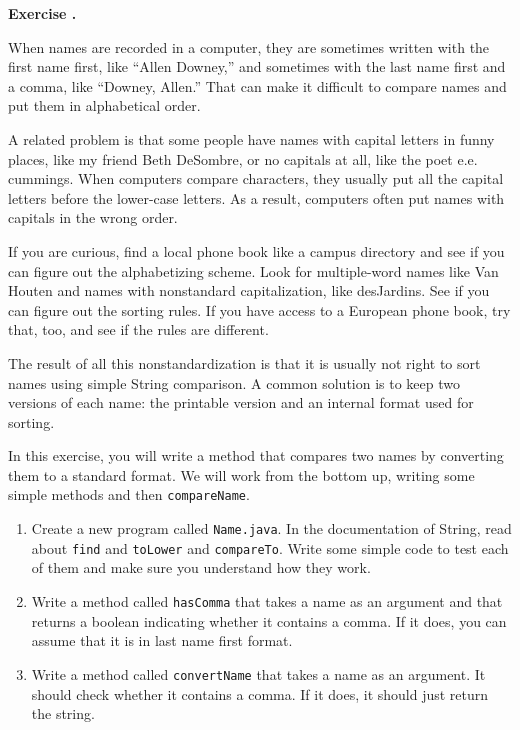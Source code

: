 \documentclass{book}
\newcounter{exercisenum}
\renewcommand{\theexercisenum}{{\thechapter}.\arabic{exercisenum}}
\newenvironment{exercisesize}{\begin{small}}{\end{small}}
\newcommand{\exerciseheader}[2]{                                          
     
  \begin{exercisesize}                                                    
     
     
  \def\theenumi{\alph{enumi}}                                             
  \def\labelenumi{\theenumi.}                                             
  \def\theenumii{\roman{enumii}}                                          
  \def\labelenumii{\theenumii.}                                           
  {\bf Exercise {#1}{#2}}\hspace{0.1in}                 
}
\newcommand{\startexercise}[1]{%
  \refstepcounter{exercisenum}                                            
  \exerciseheader{\theexercisenum}{#1}                                    
}
\newcommand{\stopexercise}{%
  {\hfill}                                                               
  \end{exercisesize}      
}
\newcommand{\normaldif}{}
\newenvironment{exercise}{\startexercise{\normaldif{}}}{\stopexercise}
\begin{document}
\begin{exercise}

When names are recorded in a computer, they are sometimes written with
the first name first, like ``Allen Downey,'' and sometimes with the
last name first and a comma, like ``Downey, Allen.''  That can make
it difficult to compare names and put them in alphabetical order.

A related problem is that some people have names with capital letters
in funny places, like my friend Beth DeSombre, or no capitals at all,
like the poet e.e. cummings.  When computers compare characters, they
usually put all the capital letters before the lower-case letters.  As
a result, computers often put names with capitals in the wrong order.

If you are curious, find a local phone book like a campus directory
and see if you can figure out the alphabetizing scheme.  Look for
multiple-word names like Van Houten and names with nonstandard
capitalization, like desJardins.  See if you can figure out the 
sorting rules.  If you have access to a European phone book, try
that, too, and see if the rules are different.

The result of all this nonstandardization is that it is usually not
right to sort names using simple String comparison.
A common solution is to keep two versions of each name: the
printable version and an internal format used for sorting.

In this exercise, you will write a method that compares two
names by converting them to a standard format.  We will work
from the bottom up, writing some simple methods and then
{\tt compareName}.

\begin{enumerate}

\item Create a new program called {\tt Name.java}.  In the
documentation of String, read about {\tt find} and {\tt toLower} and
{\tt compareTo}.  Write some simple code to test each of them and
make sure you understand how they work.

\item Write a method called {\tt hasComma} that takes a name as an
argument and that returns a boolean indicating whether it contains a
comma.  If it does, you can assume that it is in last name first
format.

\item Write a method called {\tt convertName} that takes
a name as an argument.  It should check whether it contains a
comma.  If it does, it should just return the string.


\end{enumerate}
\end{exercise}
\end{document}
